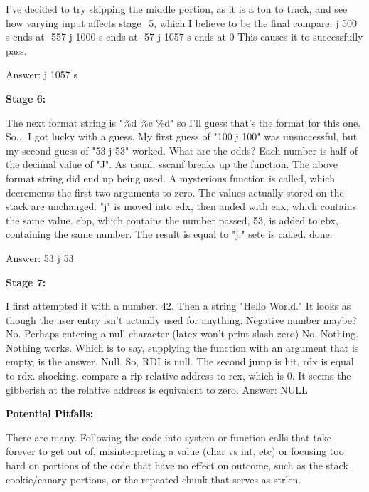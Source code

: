 \documentclass{article}
\begin{document}
    I've decided to try skipping the middle portion, as it is a ton to track, and see how varying input affects stage\_5, which I believe to be the final compare.
    j 500 s ends at -557
    j 1000 s ends at -57
    j 1057 s ends at 0
    This causes it to successfully pass.

    Answer: j 1057 s

    \bigskip

    \textbf{Stage 6:}

    \bigskip

    The next format string is "\%d \%c \%d" so I'll guess that's the format for this one.
    So... I got lucky with a guess.
    My first guess of "100 j 100" was unsuccessful, but my second guess of "53 j 53" worked. What are the odds?
    Each number is half of the decimal value of "J".
    As usual, sscanf breaks up the function. The above format string did end up being used.
    A mysterious function is called, which decrements the first two arguments to zero. The values actually stored on the stack are unchanged.
    "j" is moved into edx, then anded with eax, which contains the same value.
    ebp, which contains the number passed, 53, is added to ebx, containing the same number. The result is equal to "j." 
    sete is called.
    done.

    Answer: 53 j 53

    \bigskip

    \textbf{Stage 7:}

    \bigskip

        I first attempted it with a number. 42. Then a string "Hello World."
It looks as though the user entry isn't actually used for anything.
Negative number maybe? No.
Perhaps entering a null character (latex won't print slash zero) No.
Nothing. Nothing works. Which is to say, supplying the function with an argument that is empty, is the answer. Null.
So, RDI is null.
The second jump is hit. rdx is equal to rdx. shocking.
compare a rip relative address to rcx, which is 0.
It seems the gibberish at the relative address is equivalent to zero.
Answer: NULL

    \bigskip


    \textbf{Potential Pitfalls:}

    There are many. Following the code into system or function calls that take forever to get out of, misinterpreting a value (char vs int, etc) or focusing too hard on portions of the code that have no effect on outcome, such as the stack cookie/canary portions, or the repeated chunk that serves as strlen.
\end{document}
